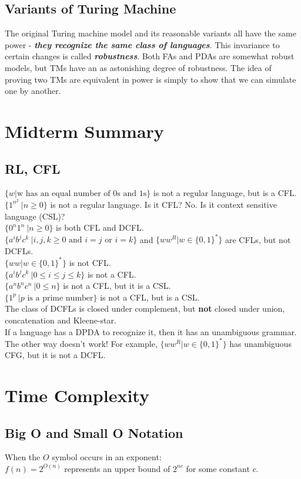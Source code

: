 \documentclass[11pt]{article}
\newcommand{\bemph}[1]{{\bfseries\itshape#1}}
\begin{document}
\subsection{Variants of Turing Machine}

The original Turing machine model and its reasonable variants all have
the same power - \bemph{they recognize the same class of
  languages}. This invariance to certain changes is called
\bemph{robustness}. Both FAs and PDAs are somewhat robust models, but
TMs have an as astonishing degree of robustness. The idea of proving
two TMs are equivalent in power is simply to show that we can simulate
one by another.

\section{Midterm Summary}
\subsection{RL, CFL}
$\{w|\text{w has an equal number of 0s and 1s}\}$ is not a regular
language, but is a CFL.\\
$\{1^{n^2}\ | n \geq 0\}$ is not a regular language. Is it CFL? No. Is
it context sensitive language (CSL)?\\
$\{0^n1^n\ | n \geq 0\}$ is both CFL and DCFL.\\
$\{a^ib^jc^k\ | i,j,k \geq 0 \text{ and }i=j \text{ or } i=k
\}$ and $\{ww^R | w \in \{0,1\}^*\}$ are CFLs, but not DCFLs. \\
$\{ww | w \in \{0,1\}^*\}$ is not CFL. \\
$\{a^ib^jc^k\ | 0 \leq i \leq j \leq k\}$ is not a CFL. \\
$\{a^nb^nc^n\ | 0 \leq n\}$ is not a CFL, but it is a CSL. \\
$\{1^{p}\ | p \text{ is a prime number}\}$ is not a CFL, but is a CSL.\\

The class of DCFLs is closed under complement, but \textbf{not} closed
under union, concatenation and Kleene-star.\\
If a language has a DPDA to recognize it, then it has an unambiguous
grammar. \\
The other way doesn't work! For example, $\{ww^R | w \in \{0,1\}^*\}$
has unambiguous CFG, but it is not a DCFL.


\section{Time Complexity}

\subsection{Big O and Small O Notation}
When the $O$ symbol occurs in an exponent:\\
$f(n) = 2^{O(n)}$ represents an upper bound of $2^{nc}$ for some constant $c$.
\end{document}
